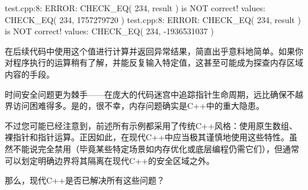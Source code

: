 \begin{shell}
test.cpp:8: ERROR: CHECK_EQ( 234, result ) is NOT correct!
  values: CHECK_EQ( 234, 1757279720 )
test.cpp:8: ERROR: CHECK_EQ( 234, result ) is NOT correct!
  values: CHECK_EQ( 234, -1936531037 )
\end{shell}

在后续代码中使用这个值进行计算并返回异常结果，简直出乎意料地简单。如果你对程序执行的运算稍有了解，并能反复输入特定值，这甚至可能成为探查内存区域内容的手段。

时间安全问题更为棘手——在庞大的代码迷宫中追踪指针生命周期，远比确保不越界访问困难得多。是的，很不幸，内存问题确实是C++中的重大隐患。

不过您可能已经注意到，前述所有示例都采用了传统C++风格：使用原生数组、裸指针和指针运算。正因如此，在现代C++中应当极其谨慎地使用这些特性。虽然不能说完全禁用（毕竟某些特定场景如内存优化或底层编程仍需它们），但通常可以划定明确边界将其隔离在现代C++的安全区域之外。

那么，现代C++是否已解决所有这些问题？
